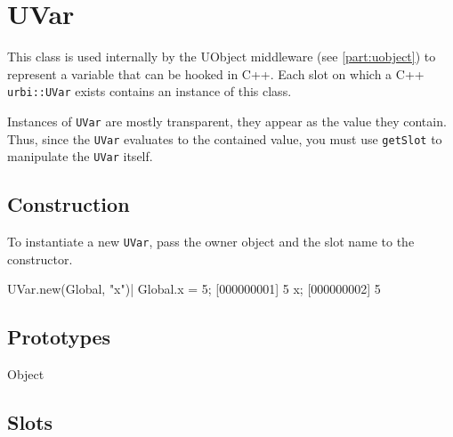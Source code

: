 \section{UVar}

This class is used internally by the UObject middleware
(see \autoref{part:uobject}) to represent a variable
that can be hooked in C++. Each slot on which a C++ \lstinline|urbi::UVar|
exists contains an instance of this class.

Instances of \lstinline|UVar| are mostly transparent, they appear as
the value they contain. Thus, since the \lstinline|UVar| evaluates to the
contained value, you must use \lstinline|getSlot| to manipulate the
\lstinline|UVar| itself.

\subsection{Construction}
To instantiate a new \lstinline|UVar|, pass the owner object and the slot
name to the constructor.
\begin{urbiscript}
UVar.new(Global, "x")|
Global.x = 5;
[000000001] 5
x;
[000000002] 5
\end{urbiscript}

\subsection{Prototypes}
\begin{refObjects}
\item[Object]
\end{refObjects}

\subsection{Slots}

